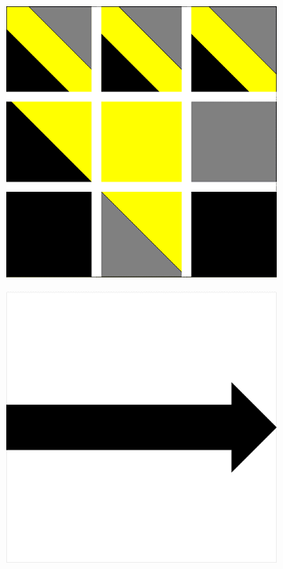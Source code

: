 \documentclass[a4paper]{article}
\begin{document}
\begin{figure}[!h]
    \centering
    \begin{subfigure}[t]{0.17\textwidth}
        \includegraphics[width=\textwidth]{img/rule60.png}
    \end{subfigure}
    \hfill
    \begin{subfigure}[t]{0.17\textwidth} 
        \includegraphics[width=\textwidth]{img/fleche3.png} 

\end{subfigure}
\end{figure}
\end{document}
